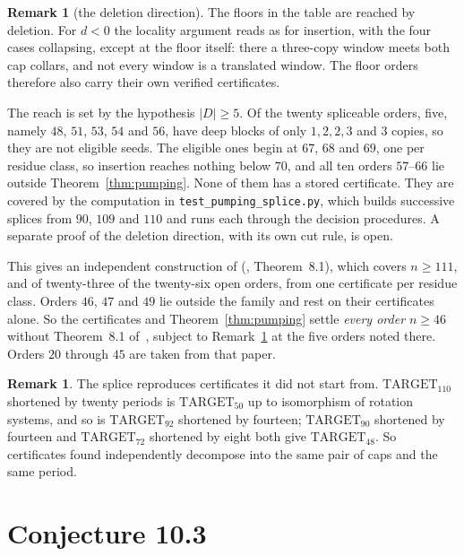 \documentclass[11pt,a4paper]{amsart}
\theoremstyle{plain}
\theoremstyle{definition}
\newtheorem{remark}[theorem]{Remark}
\begin{document}
\begin{remark}[the deletion direction]\label{rem:deletion}
The floors in the table are reached by deletion. For $d < 0$ the locality
argument reads as for insertion, with the four cases collapsing, except at the
floor itself: there a three-copy window meets both cap collars, and not every
window is a translated window. The floor orders therefore also carry their own
verified certificates.

The reach is set by the hypothesis $|D| \ge 5$. Of the twenty spliceable
orders, five, namely $48$, $51$, $53$, $54$ and $56$, have deep blocks of only
$1, 2, 2, 3$ and $3$ copies, so they are not eligible seeds. The eligible ones
begin at $67$, $68$ and $69$, one per residue class, so insertion reaches
nothing below $70$, and all ten orders $57$--$66$ lie outside
Theorem~\ref{thm:pumping}. None of them has a stored certificate. They are
covered by the computation in \texttt{test\_pumping\_splice.py}, which builds
successive splices from $90$, $109$ and $110$ and runs each through the decision
procedures. A separate proof of the deletion direction, with its own cut rule,
is open.
\end{remark}

This gives an independent construction of (\cite{AHSSV2015}, Theorem~8.1), which covers
$n \ge 111$, and of twenty-three of the twenty-six open orders, from one
certificate per residue class. Orders $46$, $47$ and $49$ lie outside the family
and rest on their certificates alone. So the certificates and
Theorem~\ref{thm:pumping} settle \emph{every order $n \ge 46$} without
Theorem~8.1 of~\cite{AHSSV2015}, subject to Remark~\ref{rem:deletion} at the
five orders noted there. Orders $20$ through $45$ are taken from that paper.

\begin{remark}
The splice reproduces certificates it did not start from.
$\mathrm{TARGET}_{110}$ shortened by twenty periods is $\mathrm{TARGET}_{50}$ up
to isomorphism of rotation systems, and so is $\mathrm{TARGET}_{92}$ shortened
by fourteen; $\mathrm{TARGET}_{90}$ shortened by fourteen and
$\mathrm{TARGET}_{72}$ shortened by eight both give $\mathrm{TARGET}_{48}$. So
certificates found independently decompose into the same pair of caps and the
same period.
\end{remark}

\section{Conjecture 10.3}\label{sec:103}
\end{document}

